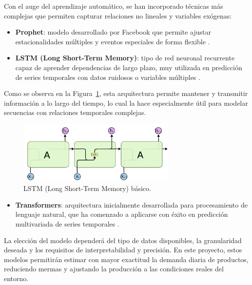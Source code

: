 Con el auge del aprendizaje automático, se han incorporado técnicas más complejas que permiten capturar relaciones no lineales y variables exógenas:

\begin{itemize}
    \item \textbf{Prophet}: modelo desarrollado por Facebook que permite ajustar estacionalidades múltiples y eventos especiales de forma flexible \parencite{taylor2018}.
    
    \item \textbf{LSTM (Long Short-Term Memory)}: tipo de red neuronal recurrente capaz de aprender dependencias de largo plazo, muy utilizada en predicción de series temporales con datos ruidosos o variables múltiples \parencite{hewamalage2021}.
\end{itemize}

Como se observa en la Figura~\ref{fig:lstm}, esta arquitectura permite mantener y transmitir información a lo largo del tiempo, lo cual la hace especialmente útil para modelar secuencias con relaciones temporales complejas.

\begin{figure}[t]
    \centering
    \includegraphics[width=0.7\textwidth]{images/lstm.png}
    \caption{LSTM (Long Short-Term Memory) básico.}
    \label{fig:lstm}
\end{figure}

\begin{itemize}
    \item \textbf{Transformers}: arquitectura inicialmente desarrollada para procesamiento de lenguaje natural, que ha comenzado a aplicarse con éxito en predicción multivariada de series temporales \parencite{li2019}.
\end{itemize}

La elección del modelo dependerá del tipo de datos disponibles, la granularidad deseada y los requisitos de interpretabilidad y precisión. En este proyecto, estos modelos permitirán estimar con mayor exactitud la demanda diaria de productos, reduciendo mermas y ajustando la producción a las condiciones reales del entorno.

